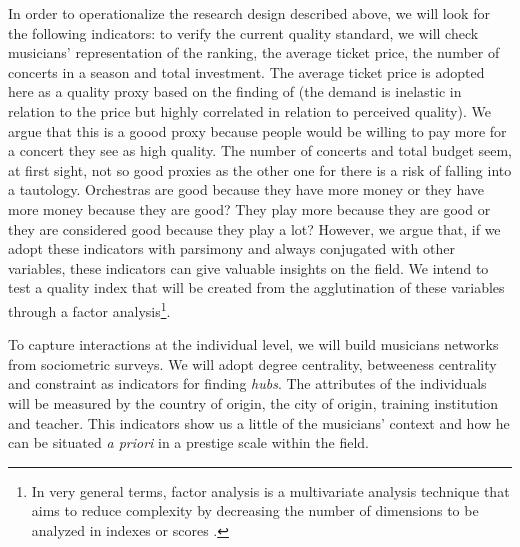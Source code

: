 \documentclass[a4paper, 12pt, openright, oneside, german, french, brazil, english, article]{abntex2}
\begin{document}
	In order to operationalize the research design described above, we will look for the following indicators: to verify the current quality standard, we will check musicians' representation of the ranking, the average ticket price, the number of concerts in a season and total investment. The average ticket price is adopted here as a quality proxy based on the finding of  (the demand is inelastic in relation to the price but highly correlated in relation to perceived quality). We argue that this is a goood proxy because people would be willing to pay more for a concert they see as high quality. The number of concerts and total budget seem, at first sight, not so good proxies as the other one for there is a risk of falling into a tautology. Orchestras are good because they have more money or they have more money because they are good? They play more because they are good or they are considered good because they play a lot? However, we argue that, if we adopt these indicators with parsimony and always conjugated with other variables, these indicators can give valuable insights on the field. We intend to test a quality index that will be created from the agglutination of these variables through a factor analysis\footnote{In very general terms, factor analysis is a multivariate analysis technique that aims to reduce complexity by decreasing the number of dimensions to be analyzed in indexes or scores \cite{mingoti2005analise}.}.
	
	
	To capture interactions at the individual level, we will build musicians networks from sociometric surveys. We will adopt degree centrality, betweeness centrality and constraint as indicators for finding \textit{hubs}. The attributes of the individuals will be measured by the country of origin, the city of origin, training institution and teacher. This indicators show us a little of the musicians' context and how he can be situated \textit{a priori} in a prestige scale within the field.
	
\end{document}
